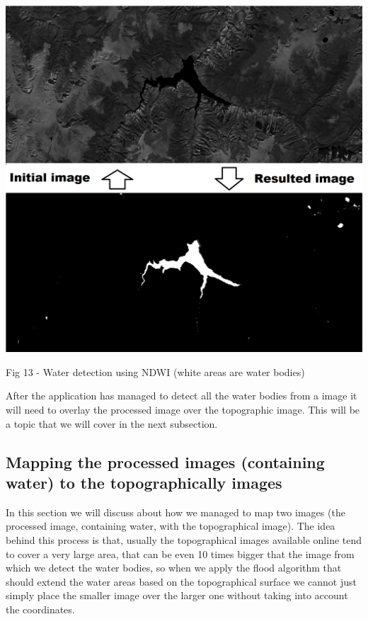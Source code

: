 \documentclass[12pt, a4paper]{report}
\begin{document}
\bigskip
\includegraphics[scale=0.4, left]{NDWI-prediction.png}
\begin{center}
Fig 13 - Water detection using NDWI (white areas are water bodies)
\end{center}
\par 

After the application has managed to detect all the water bodies from a image it will need to overlay the processed image over the topographic image. This will be a topic that we will cover in the next subsection.

\subsection{Mapping the processed images (containing water) to the topographically images}

\quad
In this section we will discuss about how we managed to map two images (the processed image, containing water, with the topographical image). The idea behind this process is that, usually the topographical images available online tend to cover a very large area, that can be even 10 times bigger that the image from which we detect the water bodies, so when we apply the flood algorithm that should extend the water areas based on the topographical surface we cannot just simply place the smaller image over the larger one without taking into account the coordinates. 
\par 
\end{document}
